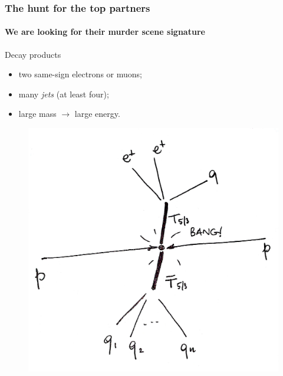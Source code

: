 \documentclass[ukenglish]{beamer}
\begin{document}
\begin{frame}
    \frametitle{The hunt for the top partners}
    \framesubtitle{We are looking for their murder scene signature}
    \begin{block}
        {Decay products}
        \begin{itemize}
            \item two same-sign electrons or muons;
            \item many \emph{jets} (at least four);
            \item large mass $\rightarrow$ large energy.
        \end{itemize}
    \end{block}
    \begin{figure}[h]
        \centering
            \includegraphics[width=.4\textwidth]{toppartner_decay}
    \end{figure}
\end{frame}
\end{document}
